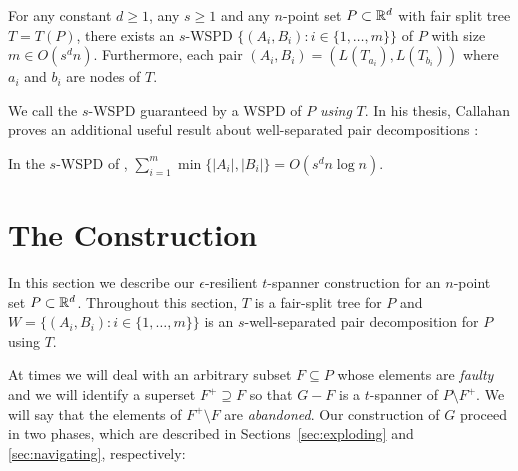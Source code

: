 \documentclass{patmorin}
\begin{document}
\begin{thm}
  For any constant $d\ge 1$, any $s\ge 1$ and any $n$-point set
  $P\subset\mathbb{R}^d$ with fair split tree $T=T(P)$, there exists an $s$-WSPD
  $\{(A_i,B_i):i\in\{1,\ldots,m\}\}$ of $P$ with size $m\in O(s^d n)$.
  Furthermore, each pair $(A_i,B_i)=(L(T_{a_i}),L(T_{b_i}))$ where $a_i$
  and $b_i$ are nodes of $T$.
\end{thm}
We call the $s$-WSPD guaranteed by  a WSPD of $P$ \emph{using}
$T$.  In his thesis, Callahan proves an additional useful result about
well-separated pair decompositions \cite[Section~4.5]{callahan:dealing}:

\begin{lem}[Callahan 1995]
  In the $s$-WSPD of ,
   $\sum_{i=1}^m\min\{|A_i|,|B_i|\} = O(s^d n\log n)$.
\end{lem}


\section{The Construction}

In this section we describe our $\epsilon$-resilient
$t$-spanner construction for an $n$-point set $P\subset\mathbb{R}^d$.
Throughout this section, $T$ is a fair-split tree for $P$ and
$W=\{(A_i,B_i):i\in\{1,\ldots,m\}\}$ is an $s$-well-separated pair
decomposition for $P$ using $T$.

At times we will deal with an arbitrary subset $F\subseteq
P$ whose elements are \emph{faulty} and we will identify a superset
$F^+\supseteq F$ so that $G-F$ is a $t$-spanner of $P\setminus F^+$.
We will say that the elements of $F^+\setminus F$ are \emph{abandoned}.
Our construction of $G$ proceed in two phases, which are described
in Sections~\ref{sec:exploding} and \ref{sec:navigating}, respectively:
\end{document}
